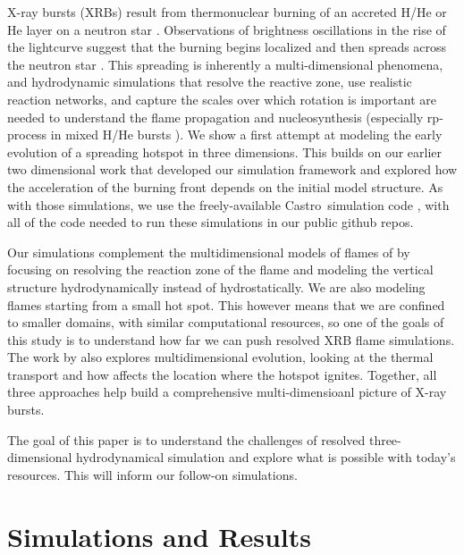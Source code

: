 \documentclass[twocolumn,times,tighten]{aastex631}
\newcommand{\castro}{{\sf Castro}}
\begin{document}
X-ray bursts (XRBs) result from thermonuclear burning of an accreted
H/He or He layer on a neutron star \citep{galloway:2017}.
Observations of brightness oscillations in the rise of the lightcurve
suggest that the burning begins localized and then spreads across the
neutron star \citep{bhattacharyya:2007}.  This spreading is inherently a multi-dimensional
phenomena, and hydrodynamic simulations that resolve the reactive
zone, use realistic reaction networks, and capture the scales over
which rotation is important are needed to understand the flame
propagation and nucleosynthesis (especially rp-process in mixed H/He bursts \citealt{rpprocess}).  We show a first attempt at modeling
the early evolution of a spreading hotspot in three dimensions.  This
builds on our earlier two dimensional work
\citep{eiden:2020,harpole:2021} that developed our simulation
framework and explored how the acceleration of the burning front
depends on the initial model structure.  As with those simulations, we
use the freely-available \castro\ simulation code
\citep{castro,castro_joss}, with all of the code
needed to run these simulations in our public github repos.

Our simulations complement the multidimensional models of flames of
\citet{cavecchi:2013,art-2015-cavecchi-etal,art-2016-cavecchi-etal,Cavecchi2019}
by focusing on resolving the reaction zone of the flame and modeling
the vertical structure hydrodynamically instead of hydrostatically.
We are also modeling flames starting from a small hot spot.  This
however means that we are confined to smaller domains, with similar
computational resources, so one of the goals of this study is to
understand how far we can push resolved XRB flame simulations.  The
work by \citet{goodwin:2021} also explores multidimensional evolution,
looking at the thermal transport and how affects the location where
the hotspot ignites.  Together, all three approaches help build a
comprehensive multi-dimensioanl picture of X-ray bursts.

The goal of this paper is to understand the challenges of resolved
three-dimensional hydrodynamical simulation and explore what is
possible with today's resources.  This will inform our follow-on
simulations.

\section{Simulations and Results}\label{Sec:results}
\end{document}
